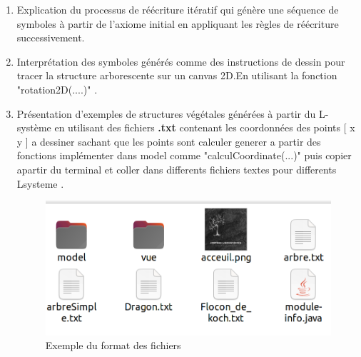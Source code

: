 \begin{enumerate}
   
    \item  Explication du processus de réécriture itératif qui génère une séquence de symboles à partir de l'axiome initial en appliquant les règles de réécriture successivement.\\
    \item   Interprétation des symboles générés comme des instructions de dessin pour tracer la structure arborescente sur un canvas 2D.En utilisant la fonction "rotation2D(....)" .
    \item  Présentation d'exemples de structures végétales générées à partir du L-système en utilisant des fichiers \textbf{.txt} contenant les coordonnées des points [ x y ] a dessiner sachant que les points sont calculer generer a partir des fonctions implémenter dans model comme "calculCoordinate(...)" puis copier
    apartir du terminal et coller dans differents fichiers textes pour differents Lsysteme .
    \begin{figure}[h]
    \centering
    \includegraphics[scale=0.3]{images/fichier.png}
    \caption{Exemple du format des fichiers}
    \end{figure}


\end{enumerate}

